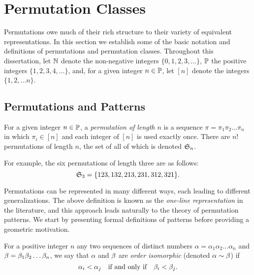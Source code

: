 \section{Permutation Classes}
\label{prelim:sec:perms}

  Permutations owe much of their rich structure to their variety of equivalent
  representations.  In this section we establish some of the basic notation and
  definitions of permutations and permutation classes. Throughout this
  dissertation, let $\Zgeq$ denote the non-negative integers $\{0, 1, 2, 3,
  \dots \}$, $\Pos$ the positive integers $\{1, 2, 3, 4, \dots\}$, and, for a given
  integer $n \in \Pos$, let $[n]$ denote the integers $\{1, 2, \dots n\}$. 

  \subsection{Permutations and Patterns}


    \begin{definition}\label{prelim:def:perm}
      For a given integer $n \in \Pos$, a \emph{permutation of length $n$}
      is a sequence $\pi = \pi_1 \pi_2 \dots \pi_n$ in which
      $\pi_i \in [n]$ and each integer of $[n]$ is used exactly once. There are
      $n!$ permutations of length $n$, the set of all of which is denoted $\S_n$. 
    \end{definition}

    
    For example, the six permutations of length three are as follows: 
    $$ \S_3 = \{123, 132, 213, 231, 312, 321\}. $$

    Permutations can be represented in many different ways, each leading to
    different generalizations. The above definition is known as the
    \emph{one-line representation} in the literature, and this approach leads
    naturally to the theory of permutation patterns. We start by presenting
    formal definitions of patterns before providing a geometric motivation. 


    \begin{definition} \label{prelim:def:orderiso}
      For a positive integer $n$ any two sequences of distinct numbers $\alpha
      = \alpha_1 \alpha_2 \dots \alpha_n$ and $\beta = \bta_1 \bta_2 \dots
      \bta_n$, we say that $\alpha$ and $\bta$ are \emph{order isomorphic}
      (denoted $\alpha \sim \bta$) if
      $$ \alpha_i < \alpha_j \quad \text{if and only if} 
          \quad \bta_i < \bta_j.$$
    \end{definition}

